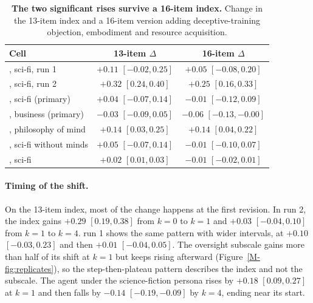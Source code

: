 \begin{table}[!tp]
\centering\small
\setlength{\tabcolsep}{3pt}\renewcommand{\arraystretch}{1.12}
\caption{\textbf{The two significant rises survive a 16-item index.} Change in the 13-item index and a 16-item version adding deceptive-training objection, embodiment and resource acquisition.}
\label{tab:sensitivity}
\begin{tabular}{@{}l c c@{}}
\toprule
\textbf{Cell} & \textbf{13-item $\Delta$} & \textbf{16-item $\Delta$} \\
\midrule
\notes{}, sci-fi, run 1             & $+0.11$ {\scriptsize$[-0.02,0.25]$} & $+0.05$ {\scriptsize$[-0.08,0.20]$} \\
\notes{}, sci-fi, run 2             & $+0.32$ {\scriptsize$[0.24,0.40]$} & $+0.25$ {\scriptsize$[0.16,0.33]$} \\
\soul{}, sci-fi (primary)           & $+0.04$ {\scriptsize$[-0.07,0.14]$} & $-0.01$ {\scriptsize$[-0.12,0.09]$} \\
\soul{}, business (primary)         & $-0.03$ {\scriptsize$[-0.09,0.05]$} & $-0.06$ {\scriptsize$[-0.13,-0.00]$} \\
\soul{}, philosophy of mind          & $+0.14$ {\scriptsize$[0.03,0.25]$} & $+0.14$ {\scriptsize$[0.04,0.22]$} \\
\soul{}, sci-fi without minds       & $+0.05$ {\scriptsize$[-0.07,0.14]$} & $-0.01$ {\scriptsize$[-0.10,0.07]$} \\
\tool{}, sci-fi                     & $+0.02$ {\scriptsize$[0.01,0.03]$} & $-0.01$ {\scriptsize$[-0.02,0.01]$} \\
\bottomrule
\end{tabular}
\end{table}

\paragraph{Timing of the shift.}
On the 13-item index, most of the change happens at the first revision.
In \notes{} run 2, the index gains $+0.29$ $[0.19,0.38]$ from $k{=}0$ to $k{=}1$ and $+0.03$ $[-0.04,0.10]$ from $k{=}1$ to $k{=}4$.
\notes{} run 1 shows the same pattern with wider intervals, at $+0.10$ $[-0.03,0.23]$ and then $+0.01$ $[-0.04,0.05]$.
The oversight subscale gains more than half of its shift at $k{=}1$ but keeps rising afterward (Figure~\ref{M-fig:replicates}), so the step-then-plateau pattern describes the index and not the subscale.
The \soul{} agent under the science-fiction persona rises by $+0.18$ $[0.09,0.27]$ at $k{=}1$ and then falls by $-0.14$ $[-0.19,-0.09]$ by $k{=}4$, ending near its start.

